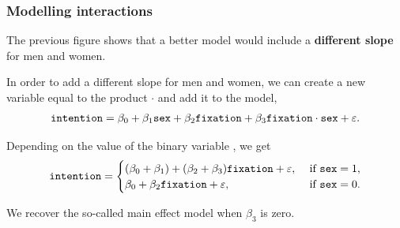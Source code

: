 \documentclass{beamer}
\begin{document}
\begin{frame}[fragile]
\frametitle{Modelling interactions}
\bi 
\item The previous figure shows that a better model would include a \alert{\textbf{different slope}} for men and women.
\item  In order to add a different slope for men and women, we can  \alert{create a new variable equal to the product}  $\cdot$   and add it to the model,
{\small 
\begin{align*}
\texttt{intention} = \beta_0 + \beta_1 \texttt{sex} + \beta_2\texttt{fixation} + \beta_3 \texttt{fixation}\cdot \texttt{sex} + \varepsilon.
\end{align*} 
}
\item Depending on the value of the binary variable , we get
{\small 
\begin{align*}
\texttt{intention} = 
\begin{cases}
(\beta_0 + \beta_1) + (\beta_2 + \beta_3)\texttt{fixation} + \varepsilon, & \text{ if } \texttt{sex}=1,\\
  \beta_0 + \beta_2 \texttt{fixation} + \varepsilon, & \text{ if } \texttt{sex}=0.                  
\end{cases}
\end{align*} 
}
\item We recover the so-called \alert{main effect model}  when $\beta_3$ is zero. 
\ei
\end{frame}
\end{document}
